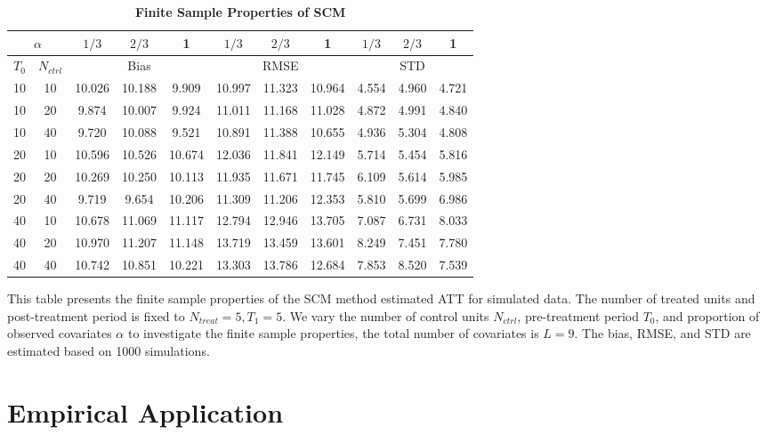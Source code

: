 \documentclass[12pt]{article}
\begin{document}
\begin{table}[!ht]
    \centering
    \caption{\textbf{Finite Sample Properties of SCM}}
    \begin{tabular}{cc|ccc|ccc|ccc}
    \toprule
    \multicolumn{2}{c|}{$\alpha$} & $1/3$ & $2/3$ & 1 & $1/3$ & $2/3$ & 1 & $1/3$ & $2/3$ & 1 \\
    \hline
    $T_0$ & $N_{ctrl}$ & \multicolumn{3}{c|}{Bias} & \multicolumn{3}{c|}{RMSE}  & \multicolumn{3}{c}{STD} \\
    \hline
    10 & 10 & 10.026 & 10.188 & 9.909 & 10.997 & 11.323 & 10.964 & 4.554 & 4.960 & 4.721 \\
    10 & 20 & 9.874 & 10.007 & 9.924 & 11.011 & 11.168 & 11.028 & 4.872 & 4.991 & 4.840 \\
    10 & 40 & 9.720 & 10.088 & 9.521 & 10.891 & 11.388 & 10.655 & 4.936 & 5.304 & 4.808 \\
\cline{1-11}
    20 & 10 & 10.596 & 10.526 & 10.674 & 12.036 & 11.841 & 12.149 & 5.714 & 5.454 & 5.816 \\
    20 & 20 & 10.269 & 10.250 & 10.113 & 11.935 & 11.671 & 11.745 & 6.109 & 5.614 & 5.985 \\
    20 & 40 & 9.719 & 9.654 & 10.206 & 11.309 & 11.206 & 12.353 & 5.810 & 5.699 & 6.986 \\
\cline{1-11}
    40 & 10 & 10.678 & 11.069 & 11.117 & 12.794 & 12.946 & 13.705 & 7.087 & 6.731 & 8.033 \\
    40 & 20 & 10.970 & 11.207 & 11.148 & 13.719 & 13.459 & 13.601 & 8.249 & 7.451 & 7.780 \\
    40 & 40 & 10.742 & 10.851 & 10.221 & 13.303 & 13.786 & 12.684 & 7.853 & 8.520 & 7.539 \\
    \bottomrule
    \end{tabular}
    \begin{tablenotes}
        \item This table presents the finite sample properties of the SCM method estimated ATT for simulated data. The number of treated units and post-treatment period is fixed to $N_{treat} = 5, T_1=5$. We vary the number of control units $N_{ctrl}$, pre-treatment period $T_0$, and proportion of observed covariates $\alpha$ to investigate the finite sample properties, the total number of covariates is $L=9$. The bias, RMSE, and STD are estimated based on 1000 simulations.
    \end{tablenotes}
    \end{table}
\section{Empirical Application}
\end{document}
